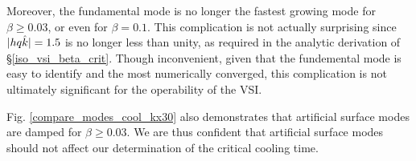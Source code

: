 Moreover, the fundamental mode is no longer the fastest growing mode for $\beta \geq 0.03$, or even 
for $\beta = 0.1$.  This complication is not actually surprising since $|hq\hat{k}| = 1.5$ is no longer less than unity,
as required in the analytic derivation of \S\ref{iso_vsi_beta_crit}.  Though  inconvenient,  given that the 
fundemental mode is easy to identify and the most numerically converged, this complication is not ultimately significant
for the operability of the VSI.  

Fig. \ref{compare_modes_cool_kx30} also demonstrates that artificial surface modes are damped for $\beta \geq 0.03$.
We are thus confident that artificial surface modes should not affect our determination of the critical cooling time.


%

